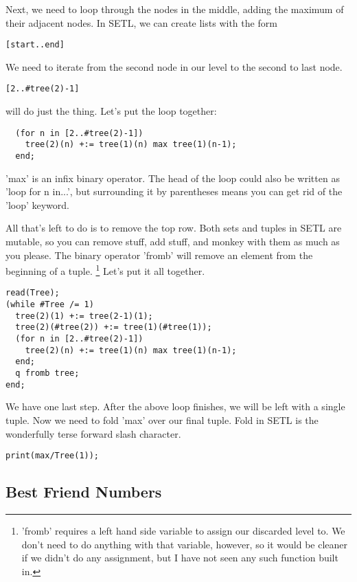 \documentclass[11pt]{article}
\begin{document}
Next, we need to loop through the nodes in the middle, adding the maximum of
their adjacent nodes. In SETL, we can create lists with the form
\begin{verbatim}
[start..end]
\end{verbatim}

We need to iterate from the second node in our level to the second to last
node. 
\begin{verbatim}
[2..#tree(2)-1]
\end{verbatim}
will do just the thing. Let's put the loop together:
\begin{verbatim}
  (for n in [2..#tree(2)-1])
    tree(2)(n) +:= tree(1)(n) max tree(1)(n-1);
  end;
\end{verbatim}

'max' is an infix binary operator. The head of the loop could also be written as
'loop for n in...', but surrounding it by parentheses means you can get rid of
the 'loop' keyword.

All that's left to do is to remove the top row. Both sets and tuples in SETL are
mutable, so you can remove stuff, add stuff, and monkey with them as much as you
please. The binary operator 'fromb' will remove an element from the beginning of
a tuple. \footnote{'fromb' requires a left hand side variable to assign
  our discarded level to. We don't need to do anything with that variable,
  however, so it would be cleaner if we didn't do any assignment, but I have not
  seen any such function built in.} Let's put it all together.

\begin{verbatim}
read(Tree);
(while #Tree /= 1)
  tree(2)(1) +:= tree(2-1)(1);
  tree(2)(#tree(2)) +:= tree(1)(#tree(1));
  (for n in [2..#tree(2)-1])
    tree(2)(n) +:= tree(1)(n) max tree(1)(n-1);
  end;
  q fromb tree;
end;
\end{verbatim}

We have one last step. After the above loop finishes, we will be left
with a single tuple. Now we need to fold 'max' over our final
tuple. Fold in SETL is the wonderfully terse forward slash character.

\begin{verbatim}
print(max/Tree(1));
\end{verbatim}

\subsection{Best Friend Numbers}
\end{document}
